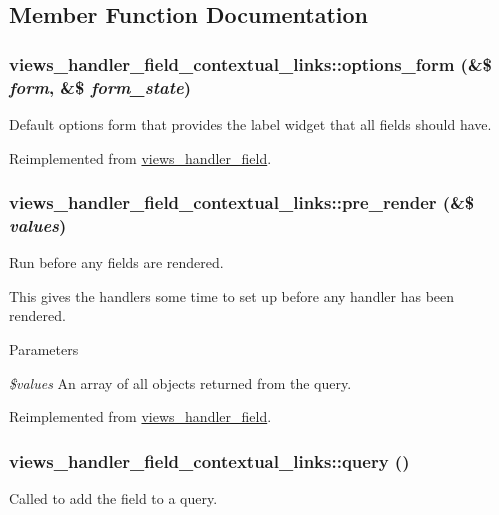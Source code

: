\subsection{Member Function Documentation}
\hypertarget{classviews__handler__field__contextual__links_a02d9fbff74abf515e5e093ff437ab792}{
\subsubsection[{options\_\-form}]{\setlength{\rightskip}{0pt plus 5cm}views\_\-handler\_\-field\_\-contextual\_\-links::options\_\-form (\&\$ {\em form}, \/  \&\$ {\em form\_\-state})}}
\label{classviews__handler__field__contextual__links_a02d9fbff74abf515e5e093ff437ab792}
Default options form that provides the label widget that all fields should have. 

Reimplemented from \hyperlink{classviews__handler__field_a0435d161922b7b4b84f02a2e79bb947a}{views\_\-handler\_\-field}.\hypertarget{classviews__handler__field__contextual__links_a8ce76077c0fd83c38ebf52649a139d37}{
\subsubsection[{pre\_\-render}]{\setlength{\rightskip}{0pt plus 5cm}views\_\-handler\_\-field\_\-contextual\_\-links::pre\_\-render (\&\$ {\em values})}}
\label{classviews__handler__field__contextual__links_a8ce76077c0fd83c38ebf52649a139d37}
Run before any fields are rendered.

This gives the handlers some time to set up before any handler has been rendered.


\begin{DoxyParams}{Parameters}
\item[{\em \$values}]An array of all objects returned from the query. \end{DoxyParams}


Reimplemented from \hyperlink{classviews__handler__field_aff134f525e1f83271183939fda4cd0e8}{views\_\-handler\_\-field}.\hypertarget{classviews__handler__field__contextual__links_a317cd0fed32b2f0fe5a11ec01b78eb1a}{
\subsubsection[{query}]{\setlength{\rightskip}{0pt plus 5cm}views\_\-handler\_\-field\_\-contextual\_\-links::query ()}}
\label{classviews__handler__field__contextual__links_a317cd0fed32b2f0fe5a11ec01b78eb1a}
Called to add the field to a query. 

